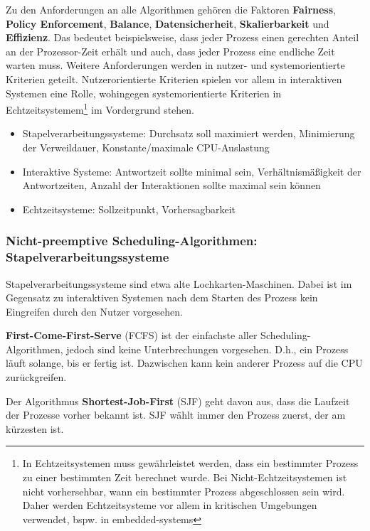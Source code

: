 Zu den Anforderungen an alle Algorithmen gehören die Faktoren \textbf{Fairness}, \textbf{Policy Enforcement}, \textbf{Balance}, \textbf{Datensicherheit}, \textbf{Skalierbarkeit} und \textbf{Effizienz}. Das bedeutet beispielsweise, dass jeder Prozess einen gerechten Anteil an der Prozessor-Zeit erhält und auch, dass jeder Prozess eine endliche Zeit warten muss. Weitere Anforderungen werden in nutzer- und systemorientierte Kriterien geteilt. Nutzerorientierte Kriterien spielen vor allem in interaktiven Systemen eine Rolle, wohingegen systemorientierte Kriterien in Echtzeitsystemem\footnote{In Echtzeitsystemen muss gewährleistet werden, dass ein bestimmter Prozess zu einer bestimmten Zeit berechnet wurde. Bei Nicht-Echtzeitsystemen ist nicht vorhersehbar, wann ein bestimmter Prozess abgeschlossen sein wird. Daher werden Echtzeitsysteme vor allem in kritischen Umgebungen verwendet, bspw. in embedded-systems} im Vordergrund stehen.
\begin{itemize}
 \item Stapelverarbeitungssysteme: Durchsatz soll maximiert werden, Minimierung der Verweildauer, Konstante/maximale CPU-Auslastung
 \item Interaktive Systeme: Antwortzeit sollte minimal sein, Verhältnismäßigkeit der Antwortzeiten, Anzahl der Interaktionen sollte maximal sein können
 \item Echtzeitsysteme: Sollzeitpunkt, Vorhersagbarkeit
\end{itemize}

\subsubsection{Nicht-preemptive Scheduling-Algorithmen: Stapelverarbeitungssysteme}

Stapelverarbeitungssysteme sind etwa alte Lochkarten-Maschinen. Dabei ist im Gegensatz zu interaktiven Systemen nach dem Starten des Prozess kein Eingreifen durch den Nutzer vorgesehen.

\textbf{First-Come-First-Serve} (FCFS) ist der einfachste aller Scheduling-Algorithmen, jedoch sind keine Unterbrechungen vorgesehen. D.h., ein Prozess läuft solange, bis er fertig ist. Dazwischen kann kein anderer Prozess auf die CPU zurückgreifen.

Der Algorithmus \textbf{Shortest-Job-First} (SJF) geht davon aus, dass die Laufzeit der Prozesse vorher bekannt ist. SJF wählt immer den Prozess zuerst, der am kürzesten ist.

